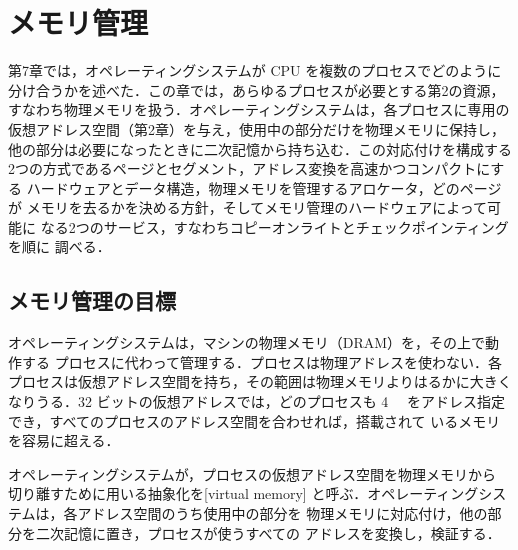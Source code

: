 \documentclass[../main.tex]{subfiles}
\begin{document}
\chapter{メモリ管理}

第7章では，オペレーティングシステムが CPU を複数のプロセスでどのように
分け合うかを述べた．この章では，あらゆるプロセスが必要とする第2の資源，
すなわち物理メモリを扱う．オペレーティングシステムは，各プロセスに専用の
仮想アドレス空間（第2章）を与え，使用中の部分だけを物理メモリに保持し，
他の部分は必要になったときに二次記憶から持ち込む．この対応付けを構成する
2つの方式であるページとセグメント，アドレス変換を高速かつコンパクトにする
ハードウェアとデータ構造，物理メモリを管理するアロケータ，どのページが
メモリを去るかを決める方針，そしてメモリ管理のハードウェアによって可能に
なる2つのサービス，すなわちコピーオンライトとチェックポインティングを順に
調べる．

\section{メモリ管理の目標}
\label{sec:l08-goals}

オペレーティングシステムは，マシンの物理メモリ（DRAM）を，その上で動作する
プロセスに代わって管理する．プロセスは物理アドレスを使わない．各
プロセスは仮想アドレス空間を持ち，その範囲は物理メモリよりはるかに大きく
なりうる．32 ビットの仮想アドレスでは，どのプロセスも \SI{4}{\gibi\byte}
をアドレス指定でき，すべてのプロセスのアドレス空間を合わせれば，搭載されて
いるメモリを容易に超える．

\begin{definition}[仮想メモリ]
  オペレーティングシステムが，プロセスの仮想アドレス空間を物理メモリから
  切り離すために用いる抽象化を[virtual memory]
  と呼ぶ．オペレーティングシステムは，各アドレス空間のうち使用中の部分を
  物理メモリに対応付け，他の部分を二次記憶に置き，プロセスが使うすべての
  アドレスを変換し，検証する．
\end{definition}
\end{document}
